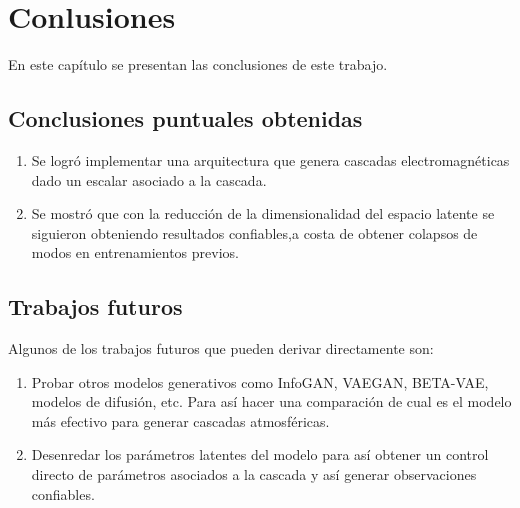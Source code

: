 
\chapter{Conlusiones} %

\label{Chapter6} %


En este capítulo se presentan las conclusiones de este trabajo.

\section{Conclusiones puntuales obtenidas}

\begin{enumerate}
    \item Se logró implementar una arquitectura que genera cascadas electromagnéticas dado un escalar asociado a la cascada.
    \item Se mostró que con la reducción de la dimensionalidad del espacio latente se siguieron obteniendo resultados confiables,a costa de obtener colapsos de modos en entrenamientos previos.
\end{enumerate}

\section{Trabajos futuros}

Algunos de los trabajos futuros que pueden derivar directamente son:
\begin{enumerate}[label=\alph*)]
    \item Probar otros modelos generativos como InfoGAN, VAEGAN, BETA-VAE, modelos de difusión, etc. Para así hacer una comparación de cual es el modelo más efectivo para generar cascadas atmosféricas.
    \item Desenredar los parámetros latentes del modelo para así obtener un control directo de parámetros asociados a la cascada y así generar observaciones confiables.
\end{enumerate}